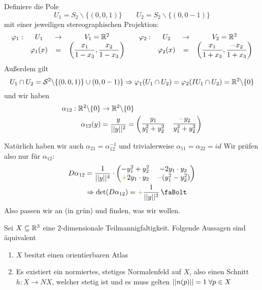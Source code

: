 \documentclass[main.tex]{subfiles}
\begin{document}
\begin{Beispiel}[$X = \mathcal{S}^2 \subseteq \R^3$]
  Definiere die Pole
  $$U_1 = S_2\backslash\{(0,0,1)\} \qquad U_2 = S_2 \backslash \{(0,0-1)\}$$
  mit einer jeweiligen stereographischen Projektion:
  $$\begin{array}{c c c c c c c c c}
    \varphi_1 : & U_1 & \to &  V_1 = \R^2 & & \varphi_2 : & U_2 & \to & V_2 = \R^2 \\
    & \varphi_1(x) & = & \left(\dfrac{x_1}{1-x_3}, \dfrac{x_2}{1-x_3} \right) & & & \varphi_2(x) & = & \left(\dfrac{x_1}{1+x_3}, \dfrac{{\color{olive} -}x_2}{1+x_3} \right)
  \end{array}$$
  Außerdem gilt
  $$U_1 \cap U_2 = \mathcal{S}^2 \backslash \{(0,0,1)\}\cup (0,0-1)\} \Rightarrow \varphi_1(U_1 \cap U_2) = \varphi_2(IU_1 \cap U_2) = \mathbb{R}^2 \backslash \{0\}$$
  und wir haben
  $$\begin{aligned}
    \alpha_{12}: \R^2 \backslash \{0\} & \to \R^2 \backslash \{0\} \\
    \alpha_{12}(y) & = \dfrac{y}{||y||^2} = \begin{pmatrix}
    \dfrac{y_1}{y_1^2 + y_2^2} & \dfrac{{\color{olive} -} y_2}{y_1^2 + y_2^2}
    \end{pmatrix}
  \end{aligned}$$

  Natürlich haben wir auch $\alpha_{21} = \alpha_{12}^{-1}$ und trivialerweise $\alpha_{11} = \alpha_{22} = id$
  Wir prüfen also nur für $\alpha_{12}$:
  $$\begin{aligned}
    D \alpha_{12} & = \dfrac{1}{||y||^4} \cdot \begin{pmatrix}
      -y_1^2 + y_2^2 & -2y_1 \cdot y_2 \\
      {\color{olive} +} 2y_1 \cdot y_2 & {\color{olive} -} (y_1^2 - y_2^2)
    \end{pmatrix} \\
    & \Rightarrow \det(  D \alpha_{12}) = {\color{olive} +}\dfrac{1}{||y||^2} \lightning
  \end{aligned}$$
  Also passen wir an (in grün) und finden, was wir wollen.
\end{Beispiel}

\begin{Theorem}
  Sei $X \subseteq \mathbb{R}^3$ eine 2-dimensionale Teilmannigfaltigkeit. Folgende Aussagen sind äquivalent
  \begin{enumerate}
    \item $X$ besitzt einen orientierbaren Atlas
    \item Es existiert ein normiertes, stetiges Normalenfeld auf $X$, also einen Schnitt $h: X \to NX$, welcher stetig ist und es muss gelten $||n(p)|| = 1 \;\forall p \in X$
  \end{enumerate}
\end{Theorem}
\end{document}
